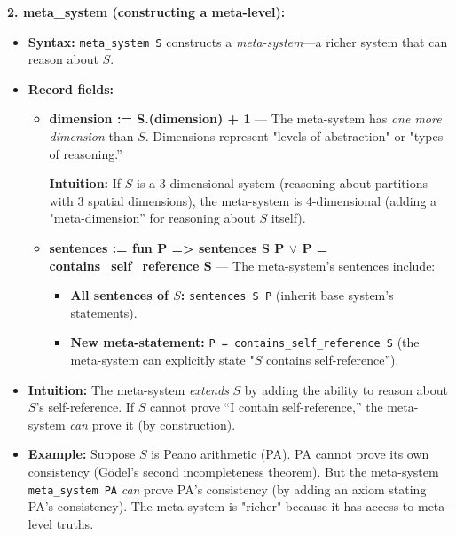 \textbf{2. meta\_system (constructing a meta-level):}
\begin{itemize}
    \item \textbf{Syntax:} \texttt{meta\_system S} constructs a \textit{meta-system}---a richer system that can reason about $S$.
    
    \item \textbf{Record fields:}
    \begin{itemize}
        \item \textbf{dimension := S.(dimension) + 1} — The meta-system has \textit{one more dimension} than $S$. Dimensions represent "levels of abstraction" or "types of reasoning.''
        
        \textbf{Intuition:} If $S$ is a 3-dimensional system (reasoning about partitions with 3 spatial dimensions), the meta-system is 4-dimensional (adding a "meta-dimension'' for reasoning about $S$ itself).
        
        \item \textbf{sentences := fun P => sentences S P $\vee$ P = contains\_self\_reference S} — The meta-system's sentences include:
        \begin{itemize}
            \item \textbf{All sentences of $S$:} \texttt{sentences S P} (inherit base system's statements).
            \item \textbf{New meta-statement:} \texttt{P = contains\_self\_reference S} (the meta-system can explicitly state "$S$ contains self-reference'').
        \end{itemize}
    \end{itemize}
    
    \item \textbf{Intuition:} The meta-system \textit{extends} $S$ by adding the ability to reason about $S$'s self-reference. If $S$ cannot prove ``I contain self-reference,'' the meta-system \textit{can} prove it (by construction).
    
    \item \textbf{Example:} Suppose $S$ is Peano arithmetic (PA). PA cannot prove its own consistency (Gödel's second incompleteness theorem). But the meta-system \texttt{meta\_system PA} \textit{can} prove PA's consistency (by adding an axiom stating PA's consistency). The meta-system is "richer" because it has access to meta-level truths.
\end{itemize}

